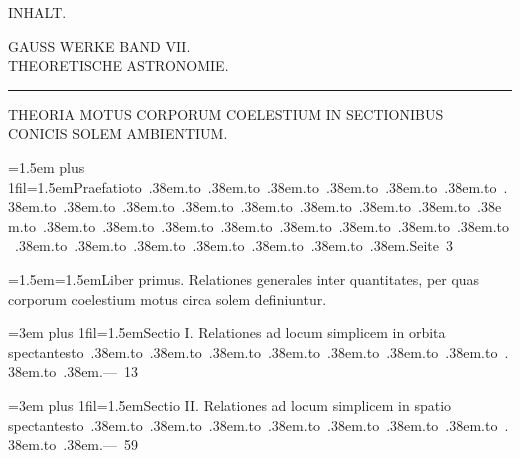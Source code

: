 \clearpage
\begingroup
{}
\renewcommand{\headrulewidth}{0pt}
\begingroup
\newcommand{\ContentsEntry}[4]{\par\begingroup\leftskip=#1\relax\rightskip=0pt plus 1fil\parfillskip=0pt\hangindent=1.5em\hangafter=1\noindent#2\nobreak\hspace{.4em}\mbox{#4}\nobreak\hspace{.5em}\hfill\mbox{#3}\par\endgroup}
\newcommand{\ContentsPoint}{\hbox to .38em{\hfil.\hfil}}
\newcommand{\ContentsText}[2]{\par\begingroup\leftskip=#1\relax\hangindent=1.5em\hangafter=1\noindent#2\par\endgroup}
\newcommand{\ContentsHeading}[1]{\needspace{4\baselineskip}\begin{center}#1\end{center}}
\newcommand{\ContentsRule}{\begin{center}\rule{.14\linewidth}{.4pt}\end{center}}
\newcommand{\ContentsJupiter}{\text{\mdseries\AstroSymbols ♃}}
\newcommand{\ContentsPallas}{\text{\mdseries\AstroSymbols ⚴}}
\ContentsHeading{{\Large INHALT.}}
\ContentsHeading{{\large GAUSS WERKE BAND VII.}\\THEORETISCHE ASTRONOMIE.}
\ContentsRule
\ContentsHeading{THEORIA MOTUS CORPORUM COELESTIUM IN SECTIONIBUS\\CONICIS SOLEM AMBIENTIUM.}
\ContentsEntry{1.5em}{Praefatio}{Seite 3}{\ContentsPoint\ContentsPoint\ContentsPoint\ContentsPoint\ContentsPoint\ContentsPoint\ContentsPoint\ContentsPoint\ContentsPoint\ContentsPoint\ContentsPoint\ContentsPoint\ContentsPoint\ContentsPoint\ContentsPoint\ContentsPoint\ContentsPoint\ContentsPoint\ContentsPoint\ContentsPoint\ContentsPoint\ContentsPoint\ContentsPoint\ContentsPoint\ContentsPoint\ContentsPoint\ContentsPoint\ContentsPoint\ContentsPoint\ContentsPoint}
\ContentsText{1.5em}{Liber primus. Relationes generales inter quantitates, per quas corporum coelestium motus circa solem definiuntur.}
\ContentsEntry{3em}{Sectio I. Relationes ad locum simplicem in orbita spectantes}{--- 13}{\ContentsPoint\ContentsPoint\ContentsPoint\ContentsPoint\ContentsPoint\ContentsPoint\ContentsPoint\ContentsPoint\ContentsPoint}
\ContentsEntry{3em}{Sectio II. Relationes ad locum simplicem in spatio spectantes}{--- 59}{\ContentsPoint\ContentsPoint\ContentsPoint\ContentsPoint\ContentsPoint\ContentsPoint\ContentsPoint\ContentsPoint\ContentsPoint}
